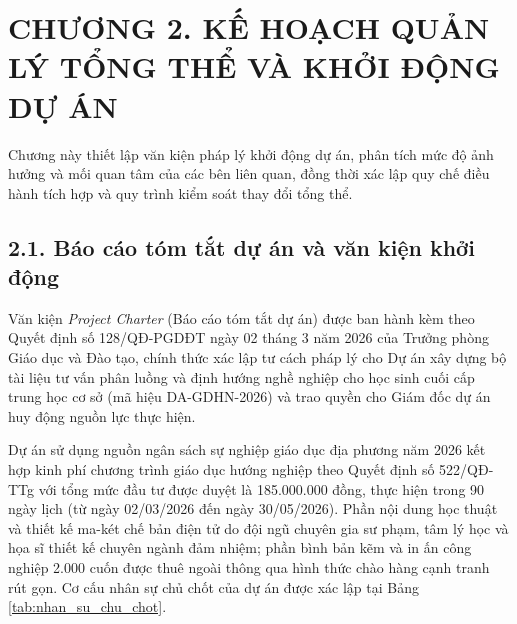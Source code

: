 \section*{CHƯƠNG 2. KẾ HOẠCH QUẢN LÝ TỔNG THỂ VÀ KHỞI ĐỘNG DỰ ÁN}

Chương này thiết lập văn kiện pháp lý khởi động dự án, phân tích mức độ ảnh hưởng và mối quan tâm của các bên liên quan, đồng thời xác lập quy chế điều hành tích hợp và quy trình kiểm soát thay đổi tổng thể.

\subsection*{2.1. Báo cáo tóm tắt dự án và văn kiện khởi động}

Văn kiện \textit{Project Charter} (Báo cáo tóm tắt dự án) được ban hành kèm theo Quyết định số 128/QĐ-PGDĐT ngày 02 tháng 3 năm 2026 của Trưởng phòng Giáo dục và Đào tạo, chính thức xác lập tư cách pháp lý cho Dự án xây dựng bộ tài liệu tư vấn phân luồng và định hướng nghề nghiệp cho học sinh cuối cấp trung học cơ sở (mã hiệu DA-GDHN-2026) và trao quyền cho Giám đốc dự án huy động nguồn lực thực hiện.

Dự án sử dụng nguồn ngân sách sự nghiệp giáo dục địa phương năm 2026 kết hợp kinh phí chương trình giáo dục hướng nghiệp theo Quyết định số 522/QĐ-TTg với tổng mức đầu tư được duyệt là 185.000.000 đồng, thực hiện trong 90 ngày lịch (từ ngày 02/03/2026 đến ngày 30/05/2026). Phần nội dung học thuật và thiết kế ma-két chế bản điện tử do đội ngũ chuyên gia sư phạm, tâm lý học và họa sĩ thiết kế chuyên ngành đảm nhiệm; phần bình bản kẽm và in ấn công nghiệp 2.000 cuốn được thuê ngoài thông qua hình thức chào hàng cạnh tranh rút gọn. Cơ cấu nhân sự chủ chốt của dự án được xác lập tại Bảng \ref{tab:nhan_su_chu_chot}.

